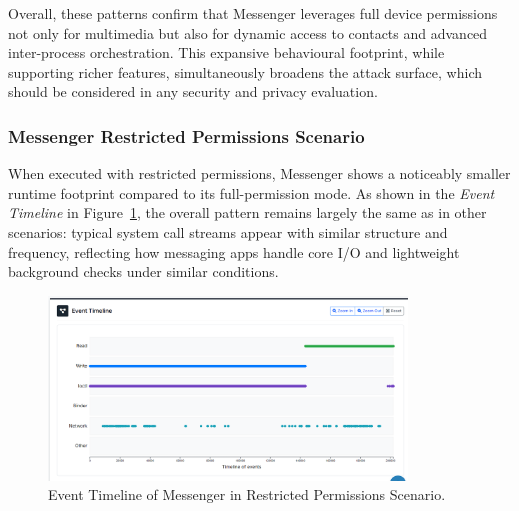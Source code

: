\documentclass[a4paper,12pt]{report}
\begin{document}
Overall, these patterns confirm that Messenger leverages full device permissions not only for multimedia but also for dynamic access to contacts and advanced inter-process orchestration. This expansive behavioural footprint, while supporting richer features, simultaneously broadens the attack surface, which should be considered in any security and privacy evaluation.


\subsubsection{Messenger Restricted Permissions Scenario}

When executed with restricted permissions, Messenger shows a noticeably smaller runtime footprint compared to its full-permission mode. As shown in the \textit{Event Timeline} in Figure~\ref{fig:messenger-none-events}, the overall pattern remains largely the same as in other scenarios: typical system call streams appear with similar structure and frequency, reflecting how messaging apps handle core I/O and lightweight background checks under similar conditions.

\begin{figure}[H]
\centering
\includegraphics[width=0.85\textwidth]{messenger-none-events.png}
\caption{Event Timeline of Messenger in Restricted Permissions Scenario.}
\label{fig:messenger-none-events}
\end{figure}
\end{document}
